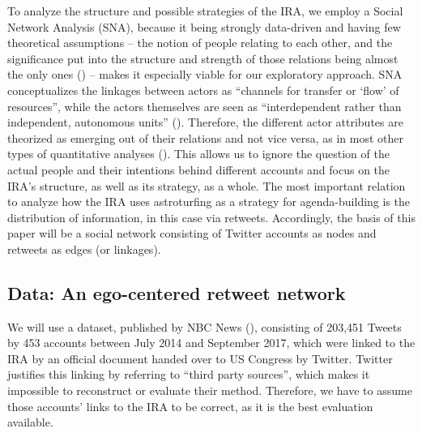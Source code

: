 \documentclass[12pt, titlepage=true, toc=bib]{scrartcl}
\begin{document}
To analyze the structure and possible strategies of the IRA, we employ a Social Network Analysis (SNA), because it being strongly data-driven and having few theoretical assumptions -- the notion of people relating to each other, and the significance put into the structure and strength of those relations being almost the only ones (\cite[982]{golovchenko_state_2018}) -- makes it especially viable for our exploratory approach. SNA conceptualizes the linkages between actors as \enquote{channels for transfer or \enquote{flow} of resources}, while the actors themselves are seen as ``interdependent rather than independent, autonomous units'' (\cite[4]{wasserman_social_1994}). Therefore, the different actor attributes are theorized as emerging out of their relations and not vice versa, as in most other types of quantitative analyses (\cite[8]{wasserman_social_1994}). This allows us to ignore the question of the actual people and their intentions behind different accounts and focus on the IRA's structure, as well as its strategy, as a whole. The most important relation to analyze how the IRA uses astroturfing as a strategy for agenda-building is the distribution of information, in this case via retweets. Accordingly, the basis of this paper will be a social network consisting of Twitter accounts as nodes and retweets as edges (or linkages).


\subsection{Data: An ego-centered retweet network}

We will use a dataset, published by NBC News (\cite*{popken_twitter_2018}), consisting of 203,451 Tweets by 453 accounts between July 2014 and September 2017, which were linked to the IRA by an official document handed over to US Congress by Twitter. Twitter justifies this linking by referring to ``third party sources'', which makes it impossible to reconstruct or evaluate their method. Therefore, we have to assume those accounts' links to the IRA to be correct, as it is the best evaluation available.
\end{document}
